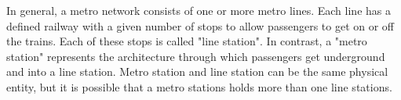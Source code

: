 In general, a metro network consists of one or more metro lines. 
Each line has a defined railway with a given number of stops to allow passengers to get on or off the trains. 
Each of these stops is called "line station". 
In contrast, a "metro station" represents the architecture through which passengers get underground and into a line station. Metro station and line station can be the same physical entity, but it is possible that a metro stations holds more than one line stations.
